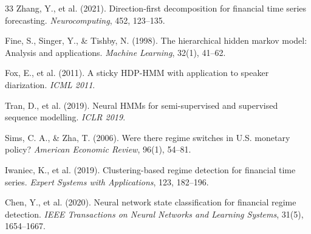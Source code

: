 \documentclass[3p,times]{elsarticle}
\begin{document}
\begin{thebibliography}{33}
Zhang, Y., et al. (2021). Direction-first decomposition for financial time series forecasting. \textit{Neurocomputing}, 452, 123--135.

Fine, S., Singer, Y., \& Tishby, N. (1998). The hierarchical hidden markov model: Analysis and applications. \textit{Machine Learning}, 32(1), 41--62.

Fox, E., et al. (2011). A sticky HDP-HMM with application to speaker diarization. \textit{ICML 2011}.

Tran, D., et al. (2019). Neural HMMs for semi-supervised and supervised sequence modelling. \textit{ICLR 2019}.

Sims, C. A., \& Zha, T. (2006). Were there regime switches in U.S. monetary policy? \textit{American Economic Review}, 96(1), 54--81.

Iwaniec, K., et al. (2019). Clustering-based regime detection for financial time series. \textit{Expert Systems with Applications}, 123, 182--196.

Chen, Y., et al. (2020). Neural network state classification for financial regime detection. \textit{IEEE Transactions on Neural Networks and Learning Systems}, 31(5), 1654--1667.

\end{thebibliography}
\end{document}
